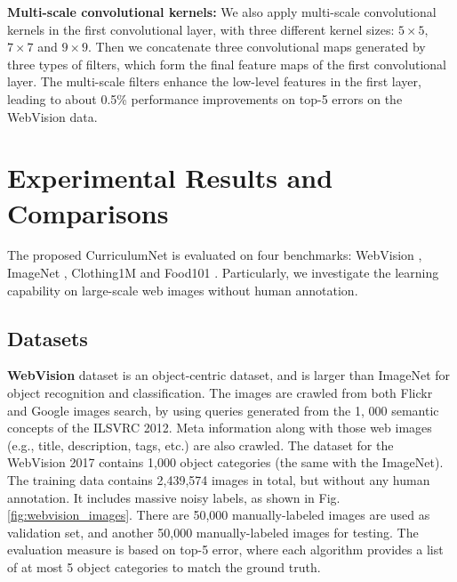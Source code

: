 \documentclass[runningheads]{llncs}
\begin{document}
\noindent \textbf{Multi-scale convolutional kernels:} We also apply multi-scale convolutional kernels in the first convolutional layer, with three different kernel sizes: $5 \times 5$, $7 \times 7$ and $9 \times 9$. Then we concatenate three convolutional maps generated by three types of filters, which form the final feature maps of the first convolutional layer. The multi-scale filters enhance the low-level features in the first layer, leading to about 0.5\% performance improvements on top-5 errors on the WebVision data.









\section{Experimental Results and Comparisons}

The proposed CurriculumNet is evaluated on four benchmarks:  WebVision \cite{li2017webvisiondata}, ImageNet \cite{DengDSLL009}, Clothing1M \cite{xiao2015learning} and Food101 \cite{bossard2014food}. Particularly, we investigate the learning capability on large-scale web images without human annotation. 

\subsection{Datasets}

\noindent \textbf{WebVision} dataset \cite{li2017webvisiondata} is an  object-centric dataset, and is larger than  ImageNet \cite{DengDSLL009}  for object recognition  and classification. The images are crawled from both Flickr and Google images search, by using queries generated from the 1, 000 semantic concepts of the ILSVRC 2012. Meta information along with those web images (e.g., title, description, tags, etc.) are also crawled. The dataset for the WebVision 2017 contains 1,000 object categories  (the same with  the ImageNet). The training data contains 2,439,574 images in total, but without any human annotation. It includes massive noisy labels, as shown in Fig. \ref{fig:webvision_images}. There are 50,000  manually-labeled images are used as validation set, and another 50,000 manually-labeled images for testing. The evaluation measure is based on top-5 error, where each algorithm provides a list of at most 5 object categories to match the ground truth. \\
\end{document}
